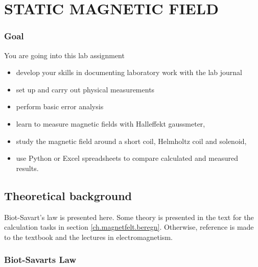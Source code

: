 \documentclass[../Elmag-labhefte-2020.tex]{subfiles}
\begin{document}
\chapter{STATIC MAGNETIC FIELD \label{ch.magnetfelt}}

\subsection*{Goal}

You are going into this lab assignment
%
\begin{itemize}
    \item develop your skills in documenting laboratory work with the lab journal
    \item set up and carry out physical measurements
    \item perform basic error analysis
    \item learn to measure magnetic fields with Halleffekt gaussmeter,
    \item study the magnetic field around a short coil, Helmholtz coil and solenoid,
    \item use Python or Excel spreadsheets to compare calculated and measured results.
\end{itemize}
%

\section{Theoretical background}

Biot-Savart's law is presented here. Some theory is presented in the text for the calculation tasks in section \ref{ch.magnetfelt.beregn}. Otherwise, reference is made to the textbook and the lectures in electromagnetism.

\subsection{Biot-Savarts Law}
\end{document}
